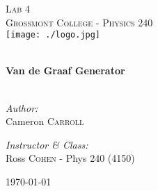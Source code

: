 \begin{titlepage}
\begin{center}

\textsc{\Large Lab 4}\\[1.5cm]
\textsc{\Large Grossmont College - Physics 240}\\[0.5cm]
\texttt{[image: ./logo.jpg]}

\HRule \\[0.4cm]
{ \LARGE \bfseries Van de Graaf Generator}\\[0.5cm]

\HRule \\[1.5cm]

\begin{minipage}{0.4\textwidth}
\begin{flushleft} \large
\emph{Author:}\\
Cameron \textsc{Carroll}
\end{flushleft}
\end{minipage}
\begin{minipage}{0.4\textwidth}
\begin{flushright} \large
\emph{Instructor \& Class:}\\
Ross \textsc{Cohen} - Phys 240 (4150)
\end{flushright}
\end{minipage}

\vfill

{\large \today}

\end{center}
\end{titlepage}